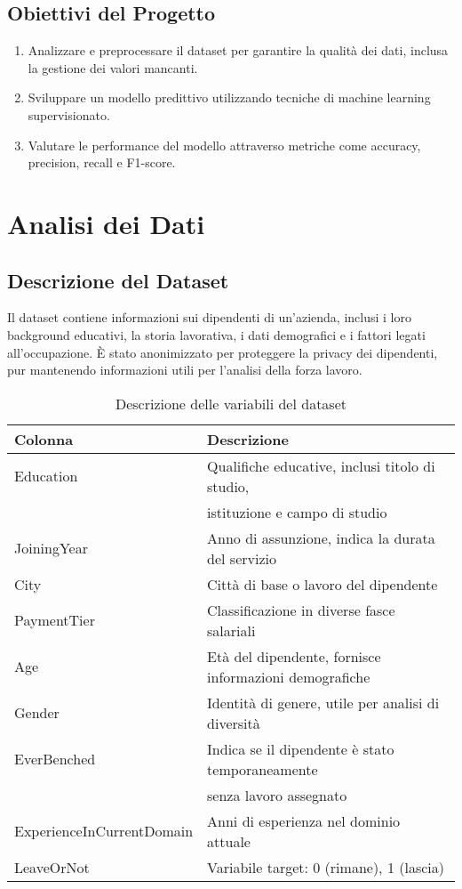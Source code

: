 \documentclass[a4paper,12pt]{article}
\begin{document}
\subsection{Obiettivi del Progetto}
\begin{enumerate}
    \item Analizzare e preprocessare il dataset per garantire la qualità dei dati, inclusa la gestione dei valori mancanti.
    \item Sviluppare un modello predittivo utilizzando tecniche di machine learning supervisionato.
    \item Valutare le performance del modello attraverso metriche come accuracy, precision, recall e F1-score.
\end{enumerate}

\section{Analisi dei Dati}

\subsection{Descrizione del Dataset}
Il dataset contiene informazioni sui dipendenti di un'azienda, inclusi i loro background educativi, la storia lavorativa, i dati demografici e i fattori legati all'occupazione. È stato anonimizzato per proteggere la privacy dei dipendenti, pur mantenendo informazioni utili per l'analisi della forza lavoro.

\begin{table}[H]
\centering
\begin{tabular}{ll}
\toprule
\textbf{Colonna} & \textbf{Descrizione} \\
\midrule
Education & Qualifiche educative, inclusi titolo di studio, \\ & istituzione e campo di studio \\
JoiningYear & Anno di assunzione, indica la durata del servizio \\
City & Città di base o lavoro del dipendente \\
PaymentTier & Classificazione in diverse fasce salariali \\
Age & Età del dipendente, fornisce informazioni demografiche \\
Gender & Identità di genere, utile per analisi di diversità \\
EverBenched & Indica se il dipendente è stato temporaneamente \\ & senza lavoro assegnato \\
ExperienceInCurrentDomain & Anni di esperienza nel dominio attuale \\
LeaveOrNot & Variabile target: 0 (rimane), 1 (lascia) \\
\bottomrule
\end{tabular}
\caption{Descrizione delle variabili del dataset}
\end{table}
\end{document}

